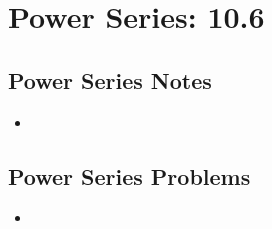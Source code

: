 \chapter{Power Series: 10.6}

\section{Power Series Notes}
\begin{itemize}
  \item
\end{itemize}

\section{Power Series Problems}
\begin{itemize}
  \item
\end{itemize}

